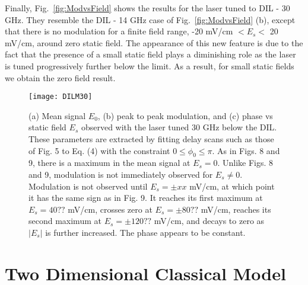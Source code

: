 \documentclass[aps,pra,preprint,groupedaddress]{revtex4-1}
\begin{document}
Finally, Fig.~\ref{fig:ModvsField} shows the results for the laser tuned to DIL - 30 GHz. They resemble the DIL - 14 GHz case of Fig.~\ref{fig:ModvsField} (b), except that there is no modulation for a finite field range, -20 mV/cm $<E_s<$ 20 mV/cm, around zero static field. The appearance of this new feature is due to the fact that the presence of a small static field plays a diminishing role as the laser is tuned progressively further below the limit. As a result, for small static fields we obtain the zero field result.


\begin{figure}
	\texttt{[image: DILM30]}
	\caption{(a) Mean signal $E_0$, (b) peak to peak modulation, and (c) phase vs static field $E_s$ observed with the laser tuned 30 GHz below the DIL. These parameters are extracted by fitting delay scans such as those of Fig. 5 to Eq. (4) with the constraint $0\leq\phi_0\leq\pi$. As in Figs. 8 and 9, there is a maximum in the mean signal at $E_s=0$. Unlike Figs. 8 and 9, modulation is not immediately observed for $E_s\neq 0$. Modulation is not observed until $E_s=\pm xx$ mV/cm, at which point it has the same sign as in Fig. 9. It reaches its first maximum at $E_s=40??$ mV/cm, crosses zero at $E_s=\pm 80 ?? $ mV/cm, reaches its second maximum at $E_s=\pm 120 ??$ mV/cm, and decays to zero as $|E_s|$ is further increased. The phase appears to be constant.}
	\label{fig:DILM30}
\end{figure}


\section{\label{sec:disc} Two Dimensional Classical Model}
\end{document}
